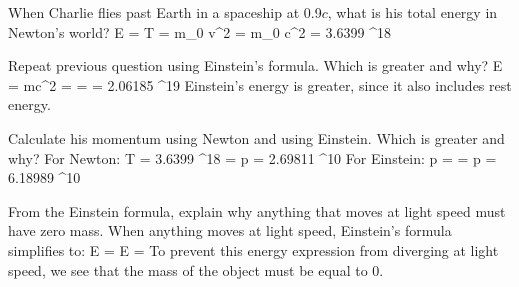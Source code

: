 \item
When Charlie flies past Earth in a spaceship at 0.9$c$, what is his total energy in Newton's world?
\be
E = T =  m_0 v^2 =  m_0 c^2 = 3.6399 ^{18} 
\ee

\item
Repeat previous question using Einstein's formula.  Which is greater and why?
\be
E = mc^2 =  =  = 2.06185 ^{19} 
\ee
Einstein's energy is greater, since it also includes rest energy.

\item
Calculate his momentum using Newton and using Einstein. Which is greater and why?
\newline For Newton:
\be
T = 3.6399 ^{18}  =  \thus p = 2.69811 ^{10} 
\ee
For Einstein:
\be
p =  =  \thus p = 6.18989 ^{10} 
\ee

\item From the Einstein formula, explain why anything that moves at light speed must have zero mass.
\newline When anything moves at light speed, Einstein's formula simplifies to:
\be
E =  \quad {} \quad E = 
\ee
To prevent this energy expression from diverging at light speed, we see that the mass of the object must be equal to $0$.

\enu 
\label{page:end}

\newpage
